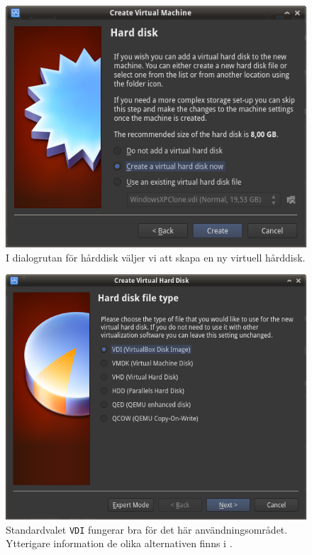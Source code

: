 \begin{figure}[htbp]
  \centering
    \includegraphics[width=\linewidth]{img/A_new-04}
    \caption{I dialogrutan för hårddisk väljer vi att skapa en ny virtuell
             hårddisk.}
  \label{}
\end{figure}

\begin{figure}[htbp]
  \centering
    \includegraphics[width=\linewidth]{img/A_new-05}
    \caption{Standardvalet \texttt{VDI} fungerar bra för det här
             användningsområdet. Ytterigare information de olika alternativen
             finns i \cite{virtualbox:vdidetails}.}
  \label{}
\end{figure}
